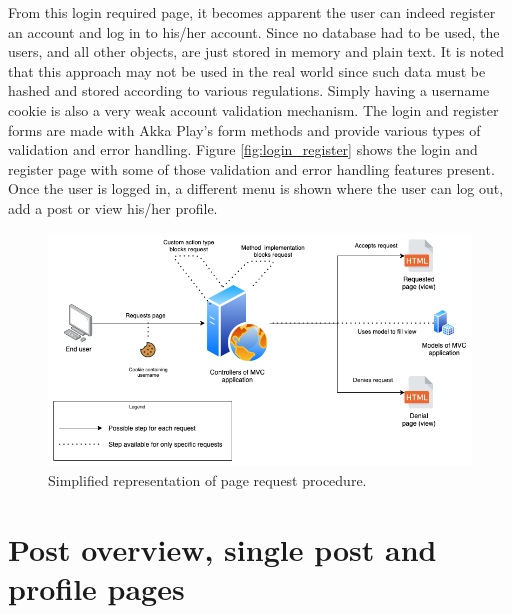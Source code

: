 From this login required page, it becomes apparent the user can indeed register an account and log in to his/her account.
Since no database had to be used, the users, and all other objects, are just stored in memory and plain text.
It is noted that this approach may not be used in the real world since such data must be hashed and stored according to various regulations.
Simply having a username cookie is also a very weak account validation mechanism.
The login and register forms are made with Akka Play's form methods and provide various types of validation and error handling.
Figure \ref{fig:login_register} shows the login and register page with some of those validation and error handling features present.
Once the user is logged in, a different menu is shown where the user can log out, add a post or view his/her profile.

\begin{figure}[H]
    \centering
    \includegraphics[width=0.8\linewidth]{images/protecting-pages.png}
    \captionsetup{width=0.75\linewidth}
    \captionsetup{justification=centering}
    \caption{Simplified representation of page request procedure. }
    \label{fig:protecting-pages}
\end{figure}



\section{Post overview, single post and profile pages}
\label{sec:main_pages}

